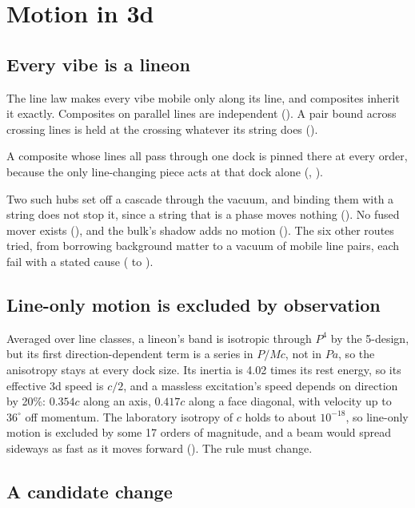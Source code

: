 \section{Motion in 3d}
\label{sec:motion}

\subsection{Every vibe is a lineon}

The line law makes every vibe mobile only along its line, and composites inherit it exactly. Composites on parallel
lines are independent (). A pair bound across crossing lines is held at the crossing whatever its
string does ().

\begin{theorem}
A composite whose lines all pass through one dock is pinned there at every order, because the only line-changing piece
acts at that dock alone (, ).
\end{theorem}

Two such hubs set off a cascade through the vacuum, and binding them with a string does not stop it, since a string
that is a phase moves nothing (). No fused mover exists (), and the bulk's shadow
adds no motion (). The six other routes tried, from borrowing background matter to a vacuum of
mobile line pairs, each fail with a stated cause ( to ).

\subsection{Line-only motion is excluded by observation}

Averaged over line classes, a lineon's band is isotropic through $P^4$ by the 5-design, but its first
direction-dependent term is a series in $P/Mc$, not in $Pa$, so the anisotropy stays at every dock size. Its inertia is
4.02 times its rest energy, so its effective 3d speed is $c/2$, and a massless excitation's speed depends on direction
by 20\%: $0.354c$ along an axis, $0.417c$ along a face diagonal, with velocity up to $36^\circ$ off momentum. The
laboratory isotropy of $c$ holds to about $10^{-18}$, so line-only motion is excluded by some 17 orders of magnitude,
and a beam would spread sideways as fast as it moves forward (). The rule must change.

\subsection{A candidate change}

